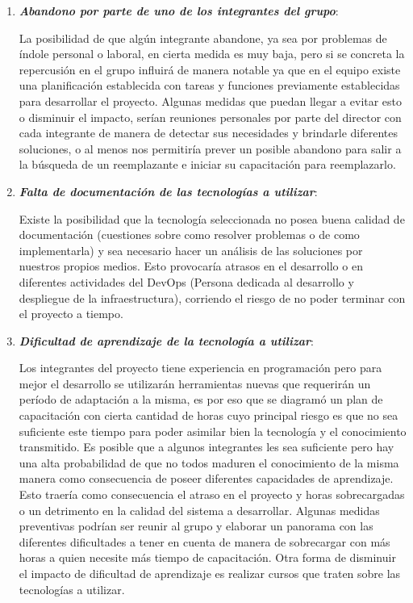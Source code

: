 	\begin{enumerate}
\item \textbf{\textit{Abandono por parte de uno de los integrantes del grupo}}:

La posibilidad de que algún integrante abandone, ya sea por problemas de índole personal o laboral, en cierta medida es muy baja, pero si se concreta la repercusión en el grupo influirá de manera notable ya que en el equipo existe una planificación establecida con tareas y funciones previamente establecidas para desarrollar el proyecto. Algunas medidas que puedan llegar a evitar esto o disminuir el impacto, serían reuniones personales por parte del director con cada integrante de manera de detectar sus necesidades y brindarle diferentes soluciones, o al menos nos permitiría prever un posible abandono para salir a la búsqueda de un reemplazante e iniciar su capacitación para reemplazarlo.

\item \textbf{\textit{Falta de documentación de las tecnologías a utilizar}}:

Existe la posibilidad que la tecnología seleccionada no posea buena calidad de documentación (cuestiones sobre como resolver problemas o de como implementarla) y sea necesario hacer un análisis de las soluciones por nuestros propios medios. Esto provocaría atrasos en el desarrollo o en diferentes actividades del DevOps (Persona dedicada al desarrollo y despliegue de la infraestructura), corriendo el riesgo de no poder terminar con el proyecto a tiempo.

\item \textbf{\textit{Dificultad de aprendizaje de la tecnología a utilizar}}:

Los integrantes del proyecto tiene experiencia en programación pero para mejor el desarrollo se utilizarán herramientas nuevas que requerirán un período de adaptación a la misma, es por eso que se diagramó un plan de capacitación con cierta cantidad de horas cuyo principal riesgo es que no sea suficiente este tiempo para poder asimilar bien la tecnología y el conocimiento transmitido. Es posible que a algunos integrantes les sea suficiente pero hay una alta probabilidad de que no todos maduren el conocimiento de la misma manera como consecuencia de poseer diferentes capacidades de aprendizaje. Esto traería como consecuencia el atraso en el proyecto y horas sobrecargadas o un detrimento en la calidad del sistema a desarrollar. Algunas medidas preventivas podrían ser reunir al grupo y  elaborar un panorama con las diferentes dificultades a tener en cuenta de manera de sobrecargar con más horas a quien necesite más tiempo de capacitación. Otra forma de disminuir el impacto de dificultad de aprendizaje es realizar cursos que traten sobre las tecnologías a utilizar.


\end{enumerate}
